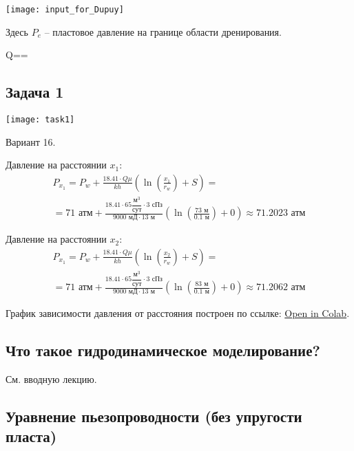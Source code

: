 \documentclass[main.tex]{subfiles}
\begin{document}
\texttt{[image: input\_for\_Dupuy]}

Здесь $P_e$ -- пластовое давление на границе области дренирования.

\beq
Q==
\eeq

\subsection{Задача 1}

\texttt{[image: task1]}

Вариант 16.

Давление на расстоянии $x_1$:
\begin{multline}
P_{x_1}=P_w+\frac{18.41\cdot Q\mu}{kh}\left(\ln{\left(\frac{x_1}{r_w}\right)+S}\right)
=\\=71\text{ атм}+\frac{18.41\cdot 65\dfrac{\text{м}^3}{\text{сут}}\cdot3\text{ сПз}}{9000\text{ мД}\cdot 13\text{ м}}\left(\ln{\left(\frac{73\text{ м}}{0.1\text{ м}}\right)}+0\right)\approx 71.2023\text{ атм}
\end{multline}

Давление на расстоянии $x_2$:
\begin{multline}
P_{x_1}=P_w+\frac{18.41\cdot Q\mu}{kh}\left(\ln{\left(\frac{x_2}{r_w}\right)+S}\right)
=\\=71\text{ атм}+\frac{18.41\cdot 65\dfrac{\text{м}^3}{\text{сут}}\cdot3\text{ сПз}}{9000\text{ мД}\cdot 13\text{ м}}\left(\ln{\left(\frac{83\text{ м}}{0.1\text{ м}}\right)}+0\right)\approx 71.2062\text{ атм}
\end{multline}

График зависимости давления от расстояния построен по ссылке: \href{https://colab.research.google.com/github/mualal/notebooks-source/blob/master/6_pressure.ipynb}{Open in Colab}.

\subsection{Что такое гидродинамическое моделирование?}

См. вводную лекцию.

\subsection{Уравнение пьезопроводности (без упругости пласта)}
\end{document}
